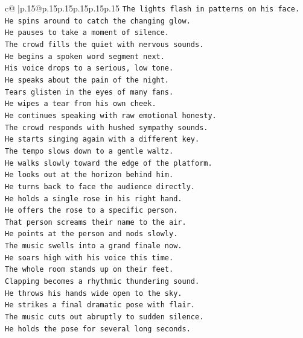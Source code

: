 \documentclass{article}
\begin{document}
{\begin{supertabular}{c@{$\;$}|p{.15\linewidth}@{}p{.15\linewidth}p{.15\linewidth}p{.15\linewidth}p{.15\linewidth}p{.15\linewidth}}
{{{\texttt{The lights flash in patterns on his face.} \\
\texttt{He spins around to catch the changing glow.} \\
\texttt{He pauses to take a moment of silence.} \\
\texttt{The crowd fills the quiet with nervous sounds.} \\
\texttt{He begins a spoken word segment next.} \\
\texttt{His voice drops to a serious, low tone.} \\
\texttt{He speaks about the pain of the night.} \\
\texttt{Tears glisten in the eyes of many fans.} \\
\texttt{He wipes a tear from his own cheek.} \\
\texttt{He continues speaking with raw emotional honesty.} \\
\texttt{The crowd responds with hushed sympathy sounds.} \\
\texttt{He starts singing again with a different key.} \\
\texttt{The tempo slows down to a gentle waltz.} \\
\texttt{He walks slowly toward the edge of the platform.} \\
\texttt{He looks out at the horizon behind him.} \\
\texttt{He turns back to face the audience directly.} \\
\texttt{He holds a single rose in his right hand.} \\
\texttt{He offers the rose to a specific person.} \\
\texttt{That person screams their name to the air.} \\
\texttt{He points at the person and nods slowly.} \\
\texttt{The music swells into a grand finale now.} \\
\texttt{He soars high with his voice this time.} \\
\texttt{The whole room stands up on their feet.} \\
\texttt{Clapping becomes a rhythmic thundering sound.} \\
\texttt{He throws his hands wide open to the sky.} \\
\texttt{He strikes a final dramatic pose with flair.} \\
\texttt{The music cuts out abruptly to sudden silence.} \\
\texttt{He holds the pose for several long seconds.} \\
}}}
\end{supertabular}}
\end{document}

